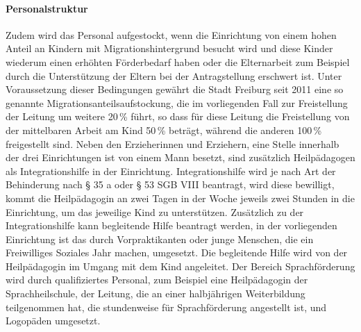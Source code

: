 \paragraph{Personalstruktur}
Zudem wird das Personal aufgestockt, wenn die Einrichtung von einem hohen Anteil an Kindern mit Migrationshintergrund besucht wird und diese Kinder wiederum einen erhöhten Förderbedarf haben oder die Elternarbeit zum Beispiel durch die Unterstützung der Eltern bei der Antragstellung erschwert ist. Unter Voraussetzung dieser Bedingungen gewährt die Stadt Freiburg seit 2011 eine so genannte Migrationsanteilsaufstockung, die im vorliegenden Fall zur Freistellung der Leitung um weitere 20\,\% führt, so dass für diese Leitung die Freistellung von der mittelbaren Arbeit am Kind 50\,\% beträgt, während die anderen 100\,\% freigestellt sind. 
Neben den Erzieherinnen und Erziehern, eine Stelle innerhalb der drei Einrichtungen ist von einem Mann besetzt, sind zusätzlich Heilpädagogen als Integrationshilfe in der Einrichtung. Integrationshilfe wird je nach Art der Behinderung nach § 35 a oder § 53 SGB VIII beantragt, wird diese bewilligt, kommt die Heilpädagogin an zwei Tagen in der Woche jeweils zwei Stunden in die Einrichtung, um das jeweilige Kind zu unterstützen. Zusätzlich zu der Integrationshilfe kann begleitende Hilfe beantragt werden, in der vorliegenden Einrichtung ist das durch Vorpraktikanten oder junge Menschen, die ein Freiwilliges Soziales Jahr machen, umgesetzt. Die begleitende Hilfe wird von der Heilpädagogin im Umgang mit dem Kind angeleitet. Der Bereich Sprachförderung wird durch qualifiziertes Personal, zum Beispiel eine Heilpädagogin der Sprachheilschule, der Leitung, die an einer halbjährigen Weiterbildung teilgenommen hat, die stundenweise für Sprachförderung angestellt ist, und Logopäden umgesetzt.  
 
 
